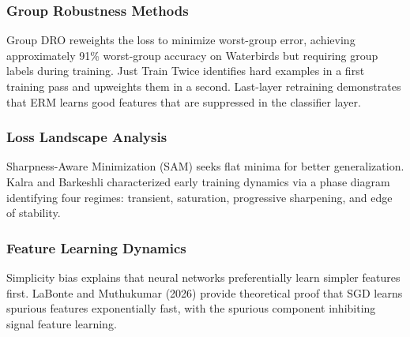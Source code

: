 
\subsubsection{Group Robustness Methods}

Group DRO reweights the loss to minimize worst-group error, achieving approximately 91\% worst-group accuracy on Waterbirds but requiring group labels during training. Just Train Twice identifies hard examples in a first training pass and upweights them in a second. Last-layer retraining demonstrates that ERM learns good features that are suppressed in the classifier layer.

\subsubsection{Loss Landscape Analysis}

Sharpness-Aware Minimization (SAM) seeks flat minima for better generalization. Kalra and Barkeshli characterized early training dynamics via a phase diagram identifying four regimes: transient, saturation, progressive sharpening, and edge of stability.

\subsubsection{Feature Learning Dynamics}

Simplicity bias explains that neural networks preferentially learn simpler features first. LaBonte and Muthukumar (2026) provide theoretical proof that SGD learns spurious features exponentially fast, with the spurious component inhibiting signal feature learning.

